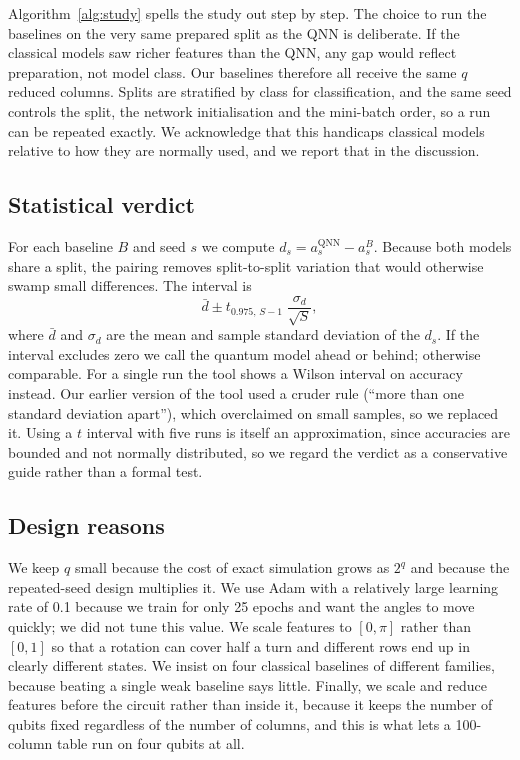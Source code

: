 \documentclass[conference]{IEEEtran}
\begin{document}
Algorithm~\ref{alg:study} spells the study out step by step. The choice to run the baselines on the very same prepared split as the QNN is deliberate. If the classical models saw richer features than the QNN, any gap would reflect preparation, not model class. Our baselines therefore all receive the same $q$ reduced columns. Splits are stratified by class for classification, and the same seed controls the split, the network initialisation and the mini-batch order, so a run can be repeated exactly. We acknowledge that this handicaps classical models relative to how they are normally used, and we report that in the discussion.

\subsection{Statistical verdict}
For each baseline $B$ and seed $s$ we compute $d_s=a_s^{\mathrm{QNN}}-a_s^{B}$. Because both models share a split, the pairing removes split-to-split variation that would otherwise swamp small differences. The interval is
\begin{equation}
  \bar d \pm t_{0.975,\,S-1}\;\frac{\sigma_d}{\sqrt{S}},
  \label{eq:paired}
\end{equation}
where $\bar d$ and $\sigma_d$ are the mean and sample standard deviation of the $d_s$. If the interval excludes zero we call the quantum model ahead or behind; otherwise comparable. For a single run the tool shows a Wilson interval on accuracy instead. Our earlier version of the tool used a cruder rule (``more than one standard deviation apart''), which overclaimed on small samples, so we replaced it. Using a $t$ interval with five runs is itself an approximation, since accuracies are bounded and not normally distributed, so we regard the verdict as a conservative guide rather than a formal test.

\subsection{Design reasons}
We keep $q$ small because the cost of exact simulation grows as $2^q$ and because the repeated-seed design multiplies it. We use Adam with a relatively large learning rate of 0.1 because we train for only 25 epochs and want the angles to move quickly; we did not tune this value. We scale features to $[0,\pi]$ rather than $[0,1]$ so that a rotation can cover half a turn and different rows end up in clearly different states. We insist on four classical baselines of different families, because beating a single weak baseline says little. Finally, we scale and reduce features before the circuit rather than inside it, because it keeps the number of qubits fixed regardless of the number of columns, and this is what lets a 100-column table run on four qubits at all.
\end{document}
